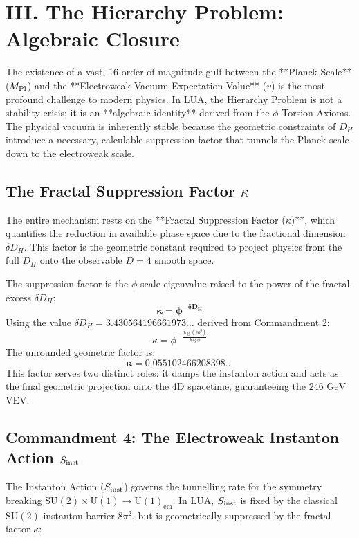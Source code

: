 \section{III. The Hierarchy Problem: Algebraic Closure}
\label{sec:hierarchy}

The existence of a vast, 16-order-of-magnitude gulf between the **Planck Scale** ($M_{\rm Pl}$) and the **Electroweak Vacuum Expectation Value** ($v$) is the most profound challenge to modern physics. In LUA, the Hierarchy Problem is not a stability crisis; it is an **algebraic identity** derived from the $\phi$-Torsion Axioms. The physical vacuum is inherently stable because the geometric constraints of $D_H$ introduce a necessary, calculable suppression factor that tunnels the Planck scale down to the electroweak scale.

\subsection{The Fractal Suppression Factor $\kappa$}
\label{sec:kappa}

The entire mechanism rests on the **Fractal Suppression Factor ($\kappa$)**, which quantifies the reduction in available phase space due to the fractional dimension $\delta D_H$. This factor is the geometric constant required to project physics from the full $D_H$ onto the observable $D=4$ smooth space.

The suppression factor is the $\phi$-scale eigenvalue raised to the power of the fractal excess $\delta D_H$:
$$
\mathbf{\kappa = \phi^{-\delta D_{H}}}
$$
Using the value $\delta D_{H} = 3.430564196661973\dots$ derived from Commandment 2:
$$
\kappa = \phi^{-\frac{\log(20^3)}{\log\phi}}
$$
The unrounded geometric factor is:
$$
\mathbf{\kappa = 0.055102466208398\dots}
$$
This factor serves two distinct roles: it damps the instanton action and acts as the final geometric projection onto the 4D spacetime, guaranteeing the $246 \text{ GeV}$ VEV.

\subsection{Commandment 4: The Electroweak Instanton Action $S_{\rm inst}$}
\label{sec:commandment4}

The Instanton Action ($S_{\rm inst}$) governs the tunnelling rate for the symmetry breaking $\text{SU}(2) \times \text{U}(1) \to \text{U}(1)_{\text{em}}$. In LUA, $S_{\rm inst}$ is fixed by the classical $\text{SU}(2)$ instanton barrier $8\pi^2$, but is geometrically suppressed by the fractal factor $\kappa$:

